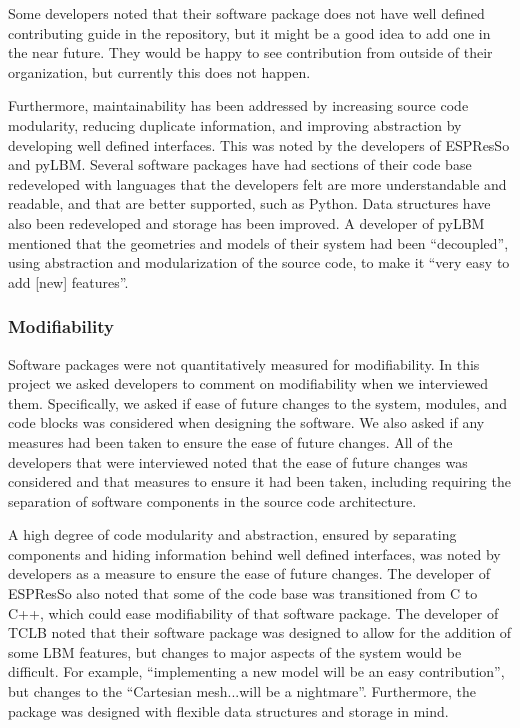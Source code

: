 \documentclass[12pt, notitlepage]{article}
\begin{document}
Some developers noted that their software package does not have well defined contributing guide in the repository, but it might be a good idea to add one in the near future. They would be happy to see contribution from outside of their organization, but currently this does not happen.

Furthermore, maintainability has been addressed by increasing source code modularity, reducing duplicate information, and improving abstraction by developing well defined interfaces. This was noted by the developers of ESPResSo and pyLBM. Several software packages have had sections of their code base redeveloped with languages that the developers felt are more understandable and readable, and that are better supported, such as Python. Data structures have also been redeveloped and storage has been improved. A developer of pyLBM mentioned that the geometries and models of their system had been ``decoupled'', using abstraction and modularization of the source code, to make it ``very easy to add [new] features''.

\subsubsection{Modifiability}

Software packages were not quantitatively measured for modifiability.
In this project we asked developers to comment on modifiability when we interviewed them. Specifically, we asked if ease of future changes to the system, modules, and code blocks was considered when designing the software. We also asked if any measures had been taken to ensure the ease of future changes. 
All of the developers that were interviewed noted that the ease of future changes was considered and that measures to ensure it had been taken, including
requiring the separation of software components in the source code architecture.

A high degree of code modularity and abstraction, ensured by separating components and hiding information behind well defined interfaces, was noted by developers as a measure to ensure the ease of future changes. The developer of ESPResSo also noted that some of the code base was transitioned from C to C++, which could ease modifiability of that software package. The developer of TCLB noted that their software package was designed to allow for the addition of some LBM features, but changes to major aspects of the system would be difficult. For example, ``implementing a new model will be an easy contribution'', but changes to the ``Cartesian mesh...will be a nightmare''. Furthermore, the package was designed with flexible data structures and storage in mind. 
\end{document}
